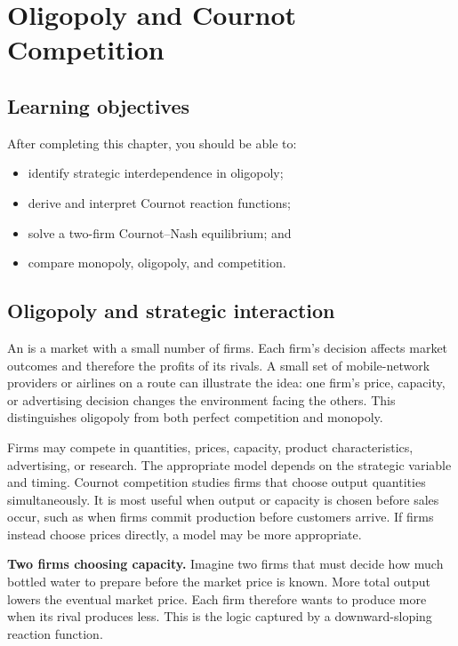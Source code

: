 \chapter{Oligopoly and Cournot Competition}
\label{chap:oligopoly}

\section{Learning objectives}

After completing this chapter, you should be able to:
\begin{itemize}
  \item identify strategic interdependence in oligopoly;
  \item derive and interpret Cournot reaction functions;
  \item solve a two-firm Cournot--Nash equilibrium; and
  \item compare monopoly, oligopoly, and competition.
\end{itemize}

\section{Oligopoly and strategic interaction}

An  is a market with a small number of firms. Each firm's
decision affects market outcomes and therefore the profits of its rivals. A
small set of mobile-network providers or airlines on a route can illustrate
the idea: one firm's price, capacity, or advertising decision changes the
environment facing the others. This 
distinguishes oligopoly from both perfect competition and monopoly.

Firms may compete in quantities, prices, capacity, product characteristics,
advertising, or research. The appropriate model depends on the strategic
variable and timing. Cournot competition studies firms that choose output
quantities simultaneously. It is most useful when output or capacity is chosen
before sales occur, such as when firms commit production before customers
arrive. If firms instead choose prices directly, a  model may be more appropriate.

\begin{exercisebox}
\textbf{Two firms choosing capacity.}
Imagine two firms that must decide how much bottled water to prepare before
the market price is known. More total output lowers the eventual market price.
Each firm therefore wants to produce more when its rival produces less. This
is the logic captured by a downward-sloping reaction function.
\end{exercisebox}

